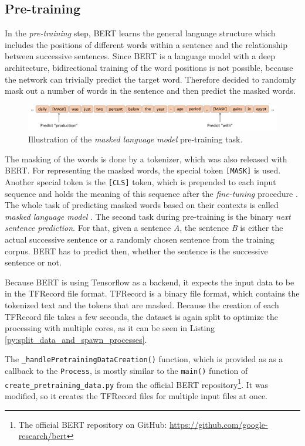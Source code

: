 \subsection{Pre-training}
In the \textit{pre-training} step, \ac{BERT} learns the general language structure which includes the positions of different words within a sentence and the relationship between successive sentences.
Since BERT is a language model with a deep architecture, bidirectional training of the word positions is not possible, because the network can trivially predict the target word. \cite[p. 4]{Devlin2018} %
Therefore \cite{Devlin2018} decided to randomly mask out a number of words in the sentence and then predict the masked words.
\begin{figure}[h]
    \centering
    \includegraphics[width=1.0\textwidth]{figures/illustration_masked_lm.png}
    \caption{Illustration of the \textit{masked language model} pre-training task.}
    \label{figure:masked_lm}
\end{figure}
The masking of the words is done by a tokenizer, which was also released with \ac{BERT}.
For representing the masked words, the special token \texttt{[MASK]} is used.
Another special token is the \texttt{[CLS]} token, which is prepended to each input sequence and holds the meaning of this sequence after the \textit{fine-tuning} procedure \cite[p. 4]{Devlin2018}.
The whole task of predicting masked words based on their contexts is called \textit{masked language model} \cite[p. 4]{Devlin2018}.
The second task during pre-training is the binary \textit{next sentence prediction}.
For that, given a sentence \textit{A}, the sentence \textit{B} is either the actual successive sentence or a randomly chosen sentence from the training corpus.
\ac{BERT} has to predict then, whether the sentence is the successive sentence or not.

Because \ac{BERT} is using Tensorflow as a backend, it expects the input data to be in the TFRecord file format.
TFRecord is a binary file format, which contains the tokenized text and the tokens that are masked.
Because the creation of each TFRecord file takes a few seconds, the dataset is again split to optimize the processing with multiple cores, as it can be seen in Listing \ref{py:split_data_and_spawn_processes}.

The \texttt{\_handlePretrainingDataCreation()} function, which is provided as as a callback to the \texttt{Process}, is mostly similar to the \texttt{main()} function of \texttt{create\_pretraining\_data.py} from the official \ac{BERT} repository\footnote{The official \ac{BERT} repository on GitHub: \url{https://github.com/google-research/bert}}.
It was modified, so it creates the TFRecord files for multiple input files at once.

